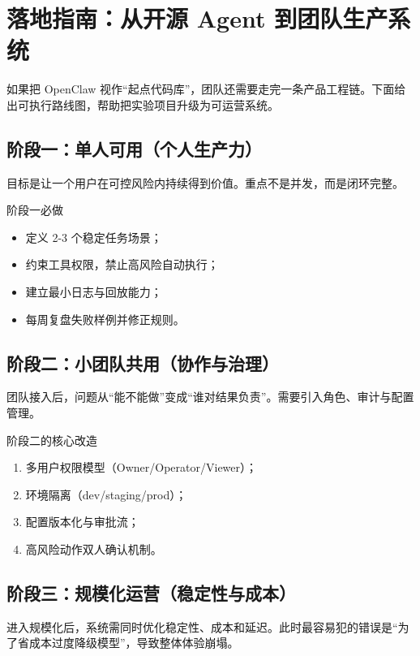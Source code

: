 \section{落地指南：从开源 Agent 到团队生产系统}

如果把 OpenClaw 视作“起点代码库”，团队还需要走完一条产品工程链。下面给出可执行路线图，帮助把实验项目升级为可运营系统。

\subsection{阶段一：单人可用（个人生产力）}

目标是让一个用户在可控风险内持续得到价值。重点不是并发，而是闭环完整。

\begin{knowledgebox}{阶段一必做}
\begin{itemize}
    \item 定义 2-3 个稳定任务场景；
    \item 约束工具权限，禁止高风险自动执行；
    \item 建立最小日志与回放能力；
    \item 每周复盘失败样例并修正规则。
\end{itemize}
\end{knowledgebox}

\subsection{阶段二：小团队共用（协作与治理）}

团队接入后，问题从“能不能做”变成“谁对结果负责”。需要引入角色、审计与配置管理。

\begin{importantbox}{阶段二的核心改造}
\begin{enumerate}
    \item 多用户权限模型（Owner/Operator/Viewer）；
    \item 环境隔离（dev/staging/prod）；
    \item 配置版本化与审批流；
    \item 高风险动作双人确认机制。
\end{enumerate}
\end{importantbox}

\subsection{阶段三：规模化运营（稳定性与成本）}

进入规模化后，系统需同时优化稳定性、成本和延迟。此时最容易犯的错误是“为了省成本过度降级模型”，导致整体体验崩塌。

